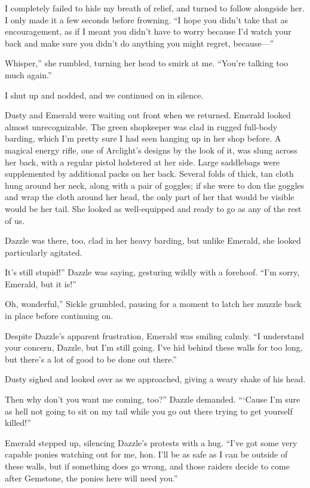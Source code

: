 I completely failed to hide my breath of relief, and turned to follow alongside her. I only made it a few seconds before frowning. “I hope you didn’t take that as encouragement, as if I meant you didn’t have to worry because I’d watch your back and make sure you didn’t do anything you might regret, because—”

\leavevmode{}Whisper,” she rumbled, turning her head to smirk at me. “You’re talking too much again.”

I shut up and nodded, and we continued on in silence.

Dusty and Emerald were waiting out front when we returned. Emerald looked almost unrecognizable. The green shopkeeper was clad in rugged full-body barding, which I’m pretty sure I had seen hanging up in her shop before. A magical energy rifle, one of Arclight’s designs by the look of it, was slung across her back, with a regular pistol holstered at her side. Large saddlebags were supplemented by additional packs on her back. Several folds of thick, tan cloth hung around her neck, along with a pair of goggles; if she were to don the goggles and wrap the cloth around her head, the only part of her that would be visible would be her tail. She looked as well-equipped and ready to go as any of the rest of us.

Dazzle was there, too, clad in her heavy barding, but unlike Emerald, she looked particularly agitated.

\leavevmode{}It’s still stupid!” Dazzle was saying, gesturing wildly with a forehoof. “I’m sorry, Emerald, but it is!”

\leavevmode{}Oh, wonderful,” Sickle grumbled, pausing for a moment to latch her muzzle back in place before continuing on.

Despite Dazzle’s apparent frustration, Emerald was smiling calmly. “I understand your concern, Dazzle, but I’m still going. I’ve hid behind these walls for too long, but there’s a lot of good to be done out there.”

Dusty sighed and looked over as we approached, giving a weary shake of his head.

\leavevmode{}Then why don’t you want me coming, too?” Dazzle demanded. “‘Cause I’m sure as hell not going to sit on my tail while you go out there trying to get yourself killed!”

Emerald stepped up, silencing Dazzle’s protests with a hug. “I’ve got some very capable ponies watching out for me, hon. I’ll be as safe as I can be outside of these walls, but if something does go wrong, and those raiders decide to come after Gemstone, the ponies here will need you.”

